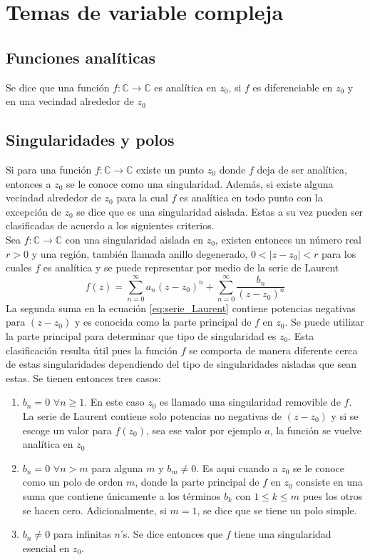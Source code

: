 \documentclass[../tesis_main_file.tex]{subfiles}
\begin{document}
\section{Temas de variable compleja}\label{Ap:temas_Var_compleja}
\subsection{Funciones analíticas}
Se dice que una función $f: \mathbb{C} \rightarrow \mathbb{C}$ es analítica en $z_0$, si $f$ es diferenciable en $z_0$ y en una vecindad alrededor de $z_0$
\subsection{Singularidades y polos}
Si para una función $f: \mathbb{C} \rightarrow \mathbb{C}$ existe un punto $z_0$ donde $f$ deja de ser analítica, entonces a $z_0$ se le conoce como una singularidad. Además, si existe alguna vecindad alrededor de $z_0$ para la cual $f$ es analítica en todo punto con la excepción de $z_0$ se dice que es una singularidad aislada. Estas a su vez pueden ser clasificadas de acuerdo a los siguientes criterios.\\
Sea $f: \mathbb{C} \rightarrow \mathbb{C}$ con una singularidad aislada en $z_0$, existen entonces un número real $r>0$ y una región, también llamada anillo degenerado, $0<|z-z_0|<r$ para los cuales $f$ es analítica y se puede representar por medio de la serie de Laurent \cite{hassani2013mathematical}
\begin{equation}
\label{eq:serie_Laurent}
f(z) = \sum^{\infty}_{n=0}a_n (z-z_0)^n + \sum^{\infty}_{n=0} \frac{b_n}{(z-z_0)^n}
\end{equation}
La segunda suma en la ecuación \ref{eq:serie_Laurent} contiene potencias negativas para $(z-z_0)$ y es conocida como la parte principal de $f$ en $z_0$. Se puede utilizar la parte principal para determinar que tipo de singularidad es $z_0$. Esta clasificación resulta útil pues la función $f$ se comporta de manera diferente cerca de estas singularidades dependiendo del tipo de singularidades aisladas que sean estas. Se tienen entonces tres casos:
\begin{enumerate}
\item $b_n=0$ $\forall n\geq1$. En este caso $z_0$ es llamado una singularidad removible de $f$. La serie de Laurent contiene solo potencias no negativas de $(z-z_0)$ y si se escoge un valor para $f(z_0)$, sea ese valor por ejemplo $a$, la función se vuelve analítica en $z_0$
\item $b_n=0$ $\forall n >m$ para alguna $m$ y $b_m \neq 0$. Es aqui cuando a $z_0$ se le conoce como un polo de orden $m$, donde la parte principal de $f$ en $z_0$ consiste en una suma que contiene únicamente a los términos $b_k$ con $1\leq k \leq m$ pues los otros se hacen cero. Adicionalmente, si $m=1$, se dice que se tiene un polo simple.
\item $b_n \neq 0$ para infinitas $n$'s. Se dice entonces que $f$ tiene una singularidad esencial en $z_0$.
\end{enumerate}
\end{document}
